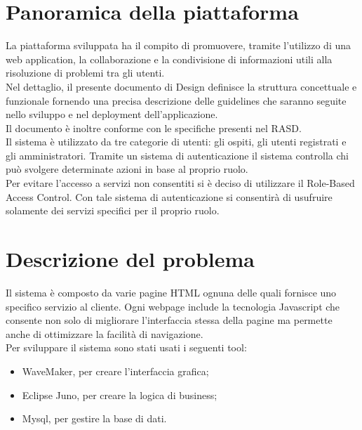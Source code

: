 \documentclass[a4paper,12pt]{article}
\begin{document}
	    \vspace*{\fill}
	\tableofcontents
	    \vspace*{\fill}

\clearpage

\section{Panoramica della piattaforma}
La piattaforma sviluppata ha il compito di promuovere, tramite l’utilizzo di una web application, la collaborazione e la condivisione di informazioni utili alla risoluzione di problemi tra gli utenti.\\[1\baselineskip]Nel dettaglio, il presente documento di Design definisce la struttura concettuale e funzionale fornendo una precisa descrizione delle guidelines che saranno seguite nello sviluppo e nel deployment dell’applicazione.\\[1\baselineskip]Il documento è inoltre conforme con le specifiche presenti nel RASD.\\[1\baselineskip]Il sistema è utilizzato da tre categorie di utenti: gli ospiti, gli utenti registrati e gli amministratori. Tramite un sistema di autenticazione il sistema controlla chi può svolgere determinate azioni in base al proprio ruolo.\\[1\baselineskip]Per evitare l’accesso a servizi non consentiti si è deciso di utilizzare il Role-Based Access Control. Con tale sistema di autenticazione si consentirà di usufruire solamente dei servizi specifici per il proprio ruolo.

\section{Descrizione del problema}
Il sistema è composto da varie pagine HTML ognuna delle quali fornisce uno specifico servizio al cliente. Ogni webpage include la tecnologia Javascript che consente non solo di migliorare l’interfaccia stessa della pagine ma permette anche di ottimizzare la facilità di navigazione.\\[1\baselineskip]Per sviluppare il sistema sono stati usati i seguenti tool:
\begin{itemize}
\item WaveMaker, per creare l’interfaccia grafica;
\item Eclipse Juno, per creare la logica di business;
\item Mysql, per gestire la base di dati.
\end{itemize}
\end{document}

